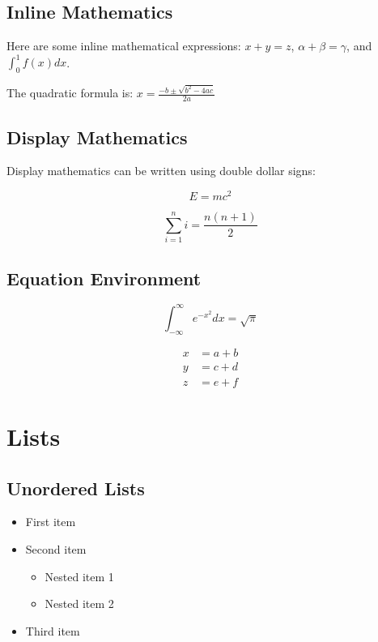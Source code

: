 \documentclass[12pt,a4paper]{article}
\begin{document}
\subsection{Inline Mathematics}

Here are some inline mathematical expressions: $x + y = z$, $\alpha + \beta = \gamma$, and $\int_0^1 f(x) dx$.

The quadratic formula is: $x = \frac{-b \pm \sqrt{b^2 - 4ac}}{2a}$

\subsection{Display Mathematics}

Display mathematics can be written using double dollar signs:

$$E = mc^2$$

$$\sum_{i=1}^{n} i = \frac{n(n+1)}{2}$$

\subsection{Equation Environment}

\begin{equation}
\int_{-\infty}^{\infty} e^{-x^2} dx = \sqrt{\pi}
\end{equation}

\begin{align}
x &= a + b \\
y &= c + d \\
z &= e + f
\end{align}

\section{Lists}

\subsection{Unordered Lists}

\begin{itemize}
    \item First item
    \item Second item
    \begin{itemize}
        \item Nested item 1
        \item Nested item 2
    \end{itemize}
    \item Third item
\end{itemize}
\end{document}
